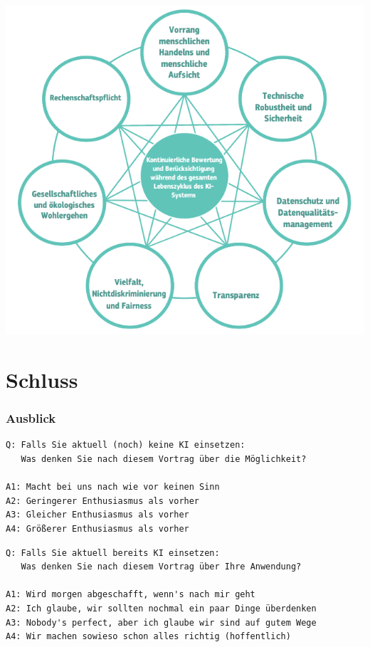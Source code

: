 \documentclass[aspectratio=169,xcolor=dvipsnames]{beamer}
\begin{document}
\begin{frame}
\begin{center}
\includegraphics[height=0.75\paperheight,keepaspectratio]{images/eu_prinzipien} 
\end{center}
\end{frame}

\section{Schluss}
\scriptsize
\begin{frame}[fragile]
\frametitle{Ausblick}
\begin{minipage}{\textwidth}
\begin{verbatim}
Q: Falls Sie aktuell (noch) keine KI einsetzen:
   Was denken Sie nach diesem Vortrag über die Möglichkeit?

A1: Macht bei uns nach wie vor keinen Sinn
A2: Geringerer Enthusiasmus als vorher
A3: Gleicher Enthusiasmus als vorher
A4: Größerer Enthusiasmus als vorher
\end{verbatim}
\end{minipage}
\pause\bigskip\bigskip

\begin{minipage}{\textwidth}
\begin{verbatim}
Q: Falls Sie aktuell bereits KI einsetzen:
   Was denken Sie nach diesem Vortrag über Ihre Anwendung?

A1: Wird morgen abgeschafft, wenn's nach mir geht
A2: Ich glaube, wir sollten nochmal ein paar Dinge überdenken
A3: Nobody's perfect, aber ich glaube wir sind auf gutem Wege
A4: Wir machen sowieso schon alles richtig (hoffentlich) 
\end{verbatim}
\end{minipage}
\end{frame}
\end{document}
